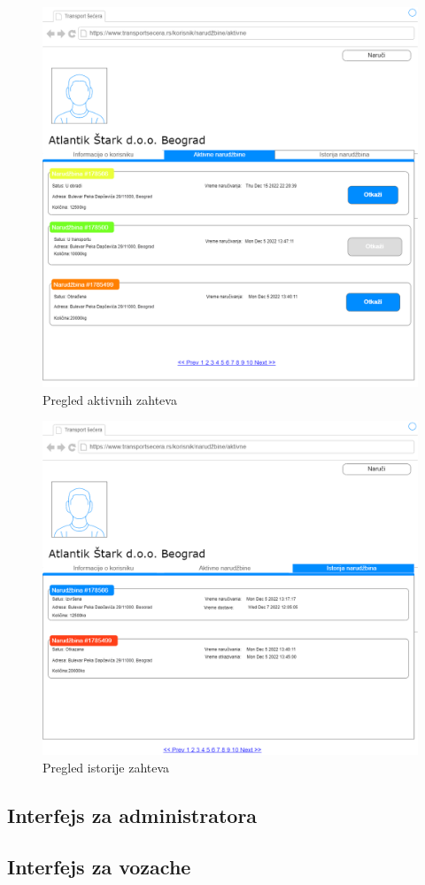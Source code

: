 \begin{figure}[H]
    \centering
    \includegraphics[scale=0.3]{Slike/KorisnickiInterfejs/Korisnik/korisnikAktivne.png}
    \caption{Pregled aktivnih zahteva}
    \label{fig:klijentAktivne}
\end{figure}
\begin{figure}[H]
    \centering
    \includegraphics[scale=0.25]{Slike/KorisnickiInterfejs/Korisnik/korisnikIstorija.png}
    \caption{Pregled istorije zahteva}
    \label{fig:klijentIstorija}
\end{figure}

\subsection{Interfejs za administratora}

\subsection{Interfejs za vozache}
